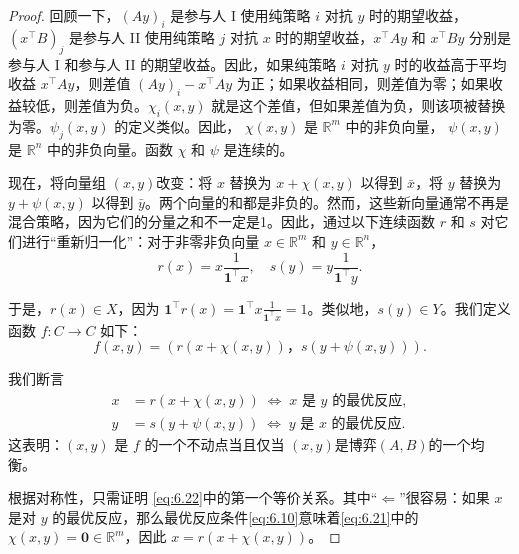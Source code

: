 \begin{proof}
回顾一下，\({\left( Ay\right) }_{i}\) 是参与人 I 使用纯策略 \(i\) 对抗 \(y\) 时的期望收益，\({\left( {x}^{\top }B\right) }_{j}\) 是参与人 II 使用纯策略 \(j\) 对抗 \(x\) 时的期望收益，\({x}^{\top }{Ay}\) 和 \({x}^{\top }{By}\) 分别是参与人 \(\mathrm{I}\) 和参与人 II 的期望收益。因此，如果纯策略 \(i\) 对抗 \(y\) 时的收益高于平均收益 \({x}^{\top }{Ay}\)，则差值 \({\left( Ay\right) }_{i} - {x}^{\top }{Ay}\) 为正；如果收益相同，则差值为零；如果收益较低，则差值为负。\({\chi }_{i}\left( {x,y}\right)\) 就是这个差值，但如果差值为负，则该项被替换为零。\({\psi }_{j}\left( {x,y}\right)\) 的定义类似。因此， \(\chi \left( {x,y}\right)\) 是 \({\mathbb{R}}^{m}\) 中的非负向量， \(\psi \left( {x,y}\right)\) 是 \({\mathbb{R}}^{n}\) 中的非负向量。函数 \(\chi\) 和 \(\psi\) 是连续的。

现在，将向量组 $(x, y)$改变：将 \(x\) 替换为 \(x + \chi \left( {x,y}\right)\) 以得到 \(\bar{x}\)，将 \(y\) 替换为 \(y + \psi \left( {x,y}\right)\) 以得到 \(\bar{y}\)。两个向量的和都是非负的。然而，这些新向量通常不再是混合策略，因为它们的分量之和不一定是1。因此，通过以下连续函数 \(r\) 和 \(s\) 对它们进行“重新归一化”：对于非零非负向量 \(x \in  {\mathbb{R}}^{m}\) 和 \(y \in  {\mathbb{R}}^{n}\)，
\[
r\left( x\right)  = x\frac{1}{{\mathbf{1}}^{\top }x},\quad s\left( y\right)  = y\frac{1}{{\mathbf{1}}^{\top }y}.
\]

于是，\(r\left( x\right)  \in  X\)，因为 \({\mathbf{1}}^{\top }r\left( x\right)  = {\mathbf{1}}^{\top }x\frac{1}{{\mathbf{1}}^{\top }x} = 1\)。类似地，\(s\left( y\right)  \in  Y\)。我们定义函数 \(f : C \rightarrow  C\) 如下：
\[
f\left( {x,y}\right)  = \left( {r\left( {x + \chi \left( {x,y}\right) }\right)，s\left( {y + \psi \left( {x,y}\right) }\right) }\right).
\]

我们断言
\begin{equation}
\label{eq:6.22}
\begin{aligned}
x &= r\!\left( x + \chi(x,y) \right)
\;\Longleftrightarrow\;
x \text{ 是 } y \text{ 的最优反应}, \\
y &= s\!\left( y + \psi(x,y) \right)
\;\Longleftrightarrow\;
y \text{ 是 } x \text{ 的最优反应}.
\end{aligned}
\end{equation}
这表明：$(x, y)$ 是 \(f\) 的一个不动点当且仅当 $(x, y) $是博弈$ (A, B) $的一个均衡。

根据对称性，只需证明 \eqref{eq:6.22}中的第一个等价关系。其中“\(\Leftarrow\)”很容易：如果 \(x\) 是对 \(y\) 的最优反应，那么最优反应条件\eqref{eq:6.10}意味着\eqref{eq:6.21}中的 \(\chi \left( {x,y}\right)  = \mathbf{0} \in  {\mathbb{R}}^{m}\)，因此 \(x = r\left( {x + \chi \left( {x,y}\right) }\right)\)。


\end{proof}
